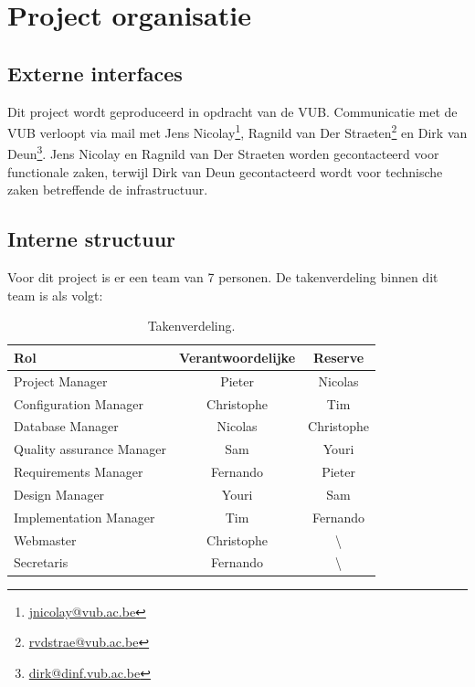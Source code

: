 \chapter{Project organisatie} \label{chap:ProjectOrganisatie}
\section{Externe interfaces}
Dit project wordt geproduceerd in opdracht van de VUB. Communicatie met de VUB verloopt via mail met Jens Nicolay\footnote{\href{mailto:jnicolay@vub.ac.be}{jnicolay@vub.ac.be}}, Ragnild van Der Straeten\footnote{\href{mailto:rvdstrae@vub.ac.be}{rvdstrae@vub.ac.be}} en Dirk van Deun\footnote{\href{mailto:dirk@dinf.vub.ac.be}{dirk@dinf.vub.ac.be}}. Jens Nicolay en Ragnild van Der Straeten worden gecontacteerd voor functionale zaken, terwijl Dirk van Deun gecontacteerd wordt voor technische zaken betreffende de infrastructuur.

\section{Interne structuur}
Voor dit project is er een team van 7 personen. De takenverdeling binnen dit team is als volgt:
\begin{table} [H]
	\centering
	\caption{Takenverdeling.}
	\begin{tabular} {l|cc}
		Rol & Verantwoordelijke & Reserve \\
		\hline
		Project Manager & Pieter & Nicolas \\
		Configuration Manager & Christophe & Tim \\
		Database Manager & Nicolas & Christophe \\
		Quality assurance Manager & Sam & Youri \\
		Requirements Manager & Fernando & Pieter \\
		Design Manager & Youri & Sam \\
		Implementation Manager & Tim & Fernando \\
		\hline
		Webmaster & Christophe & \textbackslash \\
		Secretaris & Fernando & \textbackslash 
	\end{tabular}
	\label{tab:takenverdeling}
\end{table}

